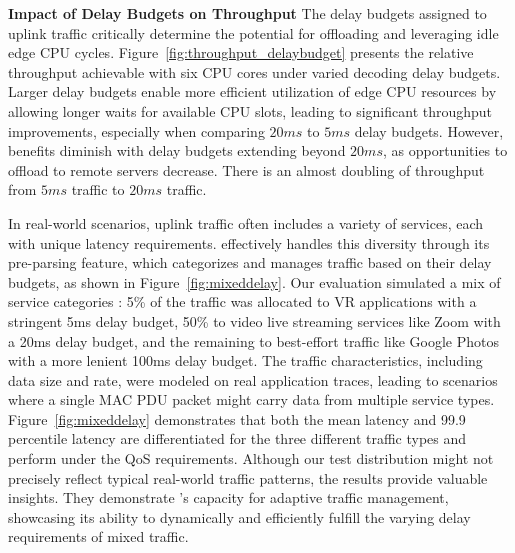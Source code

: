 \textbf{Impact of Delay Budgets on Throughput}
The delay budgets assigned to uplink traffic critically determine the potential for offloading and leveraging idle edge CPU cycles. Figure~\ref{fig:throughput_delaybudget} presents the relative throughput achievable with six CPU cores under varied decoding delay budgets. Larger delay budgets enable more efficient utilization of edge CPU resources by allowing longer waits for available CPU slots, leading to significant throughput improvements, especially when comparing $20ms$ to $5ms$ delay budgets. However, benefits diminish with delay budgets extending beyond $20ms$, as opportunities to offload to remote servers decrease. There is an almost doubling of throughput
from $5ms$ traffic to $20ms$ traffic.

In real-world scenarios, uplink traffic often includes a variety of services, each with unique latency requirements. \Name{} effectively handles this diversity through its pre-parsing feature, which categorizes and manages traffic based on their delay budgets, as shown in Figure~\ref{fig:mixeddelay}. 
Our evaluation simulated a mix of service categories
: 5\% of the traffic was allocated to VR applications with a stringent 5ms delay budget, 50\% to video live streaming services like Zoom with a 20ms delay budget, and the remaining to best-effort traffic like Google Photos with a more lenient 100ms delay budget. 
The traffic characteristics, including data size and rate, were modeled on real application traces, leading to scenarios where a single MAC PDU packet might carry data from multiple service types.
Figure~\ref{fig:mixeddelay} demonstrates that both the mean latency and 99.9 percentile latency are differentiated for the three different traffic types and perform under the QoS requirements. Although our test distribution might not precisely reflect typical real-world traffic patterns, the results provide valuable insights. They demonstrate \Name{}’s capacity for adaptive traffic management, showcasing its ability to dynamically and efficiently fulfill the varying delay requirements of mixed traffic.


































